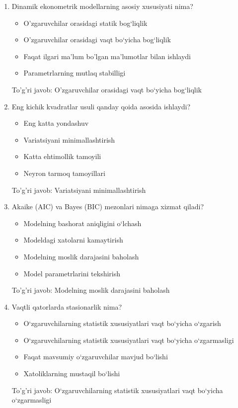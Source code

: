 \documentclass[a4paper,12pt]{article}
\begin{document}
\begin{enumerate}[label=\arabic*.]
    \item Dinamik ekonometrik modellarning asosiy xususiyati nima?
    \begin{itemize}
        \item O'zgaruvchilar orasidagi statik bog‘liqlik
        \item O'zgaruvchilar orasidagi vaqt bo‘yicha bog‘liqlik
        \item Faqat ilgari ma'lum bo'lgan ma'lumotlar bilan ishlaydi
        \item Parametrlarning mutlaq stabilligi
    \end{itemize}
    To'g'ri javob: O'zgaruvchilar orasidagi vaqt bo‘yicha bog‘liqlik

    \item Eng kichik kvadratlar usuli qanday qoida asosida ishlaydi?
    \begin{itemize}
        \item Eng katta yondashuv
        \item Variatsiyani minimallashtirish
        \item Katta ehtimollik tamoyili
        \item Neyron tarmoq tamoyillari
    \end{itemize}
    To'g'ri javob: Variatsiyani minimallashtirish

    \item Akaike (AIC) va Bayes (BIC) mezonlari nimaga xizmat qiladi?
    \begin{itemize}
        \item Modelning bashorat aniqligini o‘lchash
        \item Modeldagi xatolarni kamaytirish
        \item Modelning moslik darajasini baholash
        \item Model parametrlarini tekshirish
    \end{itemize}
    To'g'ri javob: Modelning moslik darajasini baholash

    \item Vaqtli qatorlarda stasionarlik nima?
    \begin{itemize}
        \item O‘zgaruvchilarning statistik xususiyatlari vaqt bo‘yicha o‘zgarish
        \item O‘zgaruvchilarning statistik xususiyatlari vaqt bo‘yicha o‘zgarmasligi
        \item Faqat mavsumiy o‘zgaruvchilar mavjud bo‘lishi
        \item Xatoliklarning mustaqil bo‘lishi
    \end{itemize}
    To'g'ri javob: O‘zgaruvchilarning statistik xususiyatlari vaqt bo‘yicha o‘zgarmasligi


\end{enumerate}
\end{document}
